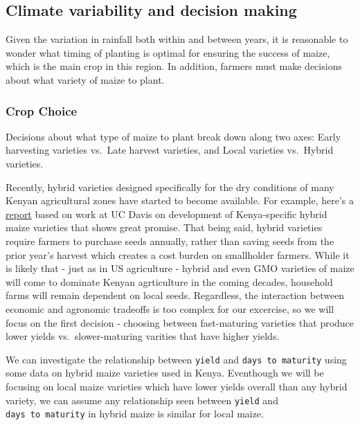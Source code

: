 \documentclass[11pt]{article}
\begin{document}
\hypertarget{climate-variability-and-decision-making}{%
\subsection{Climate variability and decision
making}\label{climate-variability-and-decision-making}}

Given the variation in rainfall both within and between years, it is
reasonable to wonder what timing of planting is optimal for ensuring the
success of maize, which is the main crop in this region. In addition,
farmers must make decisions about what variety of maize to plant.

\hypertarget{crop-choice}{%
\subsubsection{Crop Choice}\label{crop-choice}}

Decisions about what type of maize to plant break down along two axes:
Early harvesting varieties vs.~Late harvest varieties, and Local
varieties vs.~Hybrid varieties.

Recently, hybrid varieties designed specifically for the dry conditions
of many Kenyan agricultural zones have started to become available. For
example, here's a
\href{https://basis.ucdavis.edu/news/one-change-hybrid-seeds-could-boost-maize-productivity-western-kenya}{report}
based on work at UC Davis on development of Kenya-specific hybrid maize
varieties that shows great promise. That being said, hybrid varieties
require farmers to purchase seeds annually, rather than saving seeds
from the prior year's harvest which creates a cost burden on smallholder
farmers. While it is likely that - just as in US agriculture - hybrid
and even GMO varieties of maize will come to dominate Kenyan
agrticulture in the coming decades, household farms will remain
dependent on local seeds. Regardless, the interaction between economic
and agronomic tradeoffs is too complex for our excercise, so we will
focus on the first decision - choosing between fast-maturing varieties
that produce lower yields vs.~slower-maturing varities that have higher
yields.

We can investigate the relationship between \texttt{yield} and
\texttt{days\ to\ maturity} using some data on hybrid maize varieties
used in Kenya. Eventhough we will be focusing on local maize varieties
which have lower yields overall than any hybrid variety, we can assume
any relationship seen between \texttt{yield} and
\texttt{days\ to\ maturity} in hybrid maize is similar for local maize.
\end{document}
